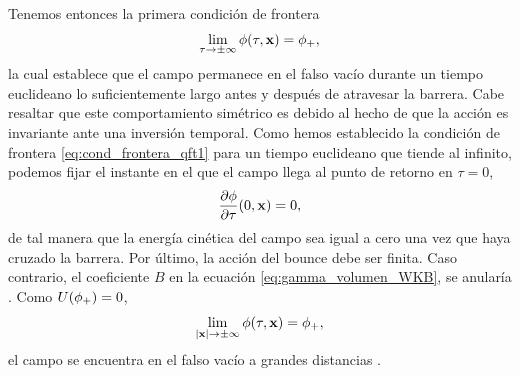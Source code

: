 Tenemos entonces la primera condición de frontera 
\begin{equation} \label{eq:cond_frontera_qft1}
\lim_{\tau \rightarrow \pm\infty} \phi\qty(\tau, \vb{x}) = \phi_+,
\end{equation}
la cual establece que el
campo permanece en el falso vacío durante un tiempo euclideano lo suficientemente largo antes y después de atravesar la barrera. Cabe resaltar que este comportamiento simétrico es debido al hecho de que la acción es invariante ante una inversión temporal. Como hemos establecido la condición de frontera \eqref{eq:cond_frontera_qft1} para un tiempo euclideano que tiende al infinito, 
podemos fijar el instante en el que el campo llega al punto de retorno en $\tau = 0$,
\begin{equation} \label{eq:cond_frontera_qft2}
\pdv{\phi}{\tau}\qty(0, \vb{x}) = 0,
\end{equation}
de tal manera que la energía cinética del campo sea igual a cero una vez que haya cruzado la barrera. 
Por último, la acción del bounce debe ser finita. Caso contrario, el coeficiente $B$ en la ecuación \eqref{eq:gamma_volumen_WKB}, se anularía \cite{lee2005fate}. Como $U\qty(\phi_+) = 0$,
\begin{equation} \label{eq:cond_frontera_qft3}
\lim_{\qty|\vb{x}| \rightarrow \pm\infty} \phi\qty(\tau, \vb{x}) = \phi_+,
\end{equation}
el campo se encuentra en el falso vacío a grandes distancias \cite{Masoumi:2015psa}. %


